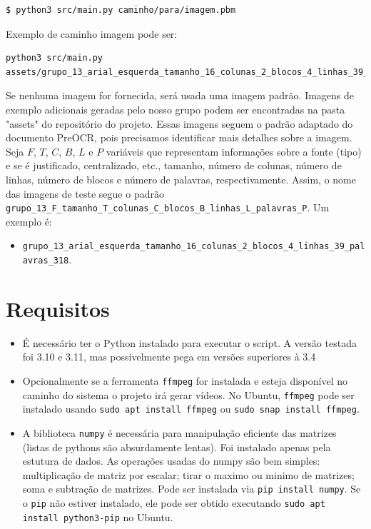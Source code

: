 \documentclass[english, 
               brazil, 
               bsc] %
               {dcomp-abntex2}
\begin{document}
\begin{verbatim}
$ python3 src/main.py caminho/para/imagem.pbm
\end{verbatim}

Exemplo de caminho imagem pode ser:
\begin{verbatim}
python3 src/main.py assets/grupo_13_arial_esquerda_tamanho_16_colunas_2_blocos_4_linhas_39_palavras_318.pbm
\end{verbatim}

Se nenhuma imagem for fornecida, será usada uma imagem padrão. Imagens de exemplo adicionais geradas pelo nosso grupo podem ser encontradas na pasta "assets" do repositório do projeto. Essas imagens seguem o padrão adaptado do documento PreOCR, pois precisamos identificar mais detalhes sobre a imagem. Seja $F$, $T$, $C$, $B$, $L$ e $P$ variáveis que representam informações sobre a fonte (tipo) e se é justificado, centralizado, etc., tamanho, número de colunas, número de linhas, número de blocos e número de palavras, respectivamente. Assim, o nome das imagens de teste segue o padrão \texttt{grupo\_13\_F\_tamanho\_T\_colunas\_C\_blocos\_B\_linhas\_L\_palavras\_P}. Um exemplo é:

\begin{itemize}
  \item \texttt{\small grupo\_13\_arial\_esquerda\_tamanho\_16\_colunas\_2\_blocos\_4\_linhas\_39\_palavras\_318}.
\end{itemize}

\section{Requisitos}
\begin{itemize}
  \item É necessário ter o Python instalado para executar o script. A versão testada foi 3.10 e 3.11, mas possivelmente pega em versões superiores à 3.4
  \item Opcionalmente se a ferramenta \texttt{ffmpeg} for instalada e esteja disponível no caminho do sistema o projeto irá gerar vídeos. No Ubuntu, \texttt{ffmpeg} pode ser instalado usando \texttt{sudo apt install ffmpeg} ou \texttt{sudo snap install ffmpeg}.
  \item A biblioteca \texttt{numpy} é necessária para manipulação eficiente das matrizes (listas de pythons são absurdamente lentas). Foi instalado apenas pela estutura de dados. As operações usadas do numpy são bem simples:  multiplicação de matriz por escalar; tirar o maximo ou minimo de matrizes; soma e subtração de matrizes. Pode ser instalada via \texttt{pip install numpy}. Se o \texttt{pip} não estiver instalado, ele pode ser obtido executando \texttt{sudo apt install python3-pip} no Ubuntu. \end{itemize}
\end{document}
